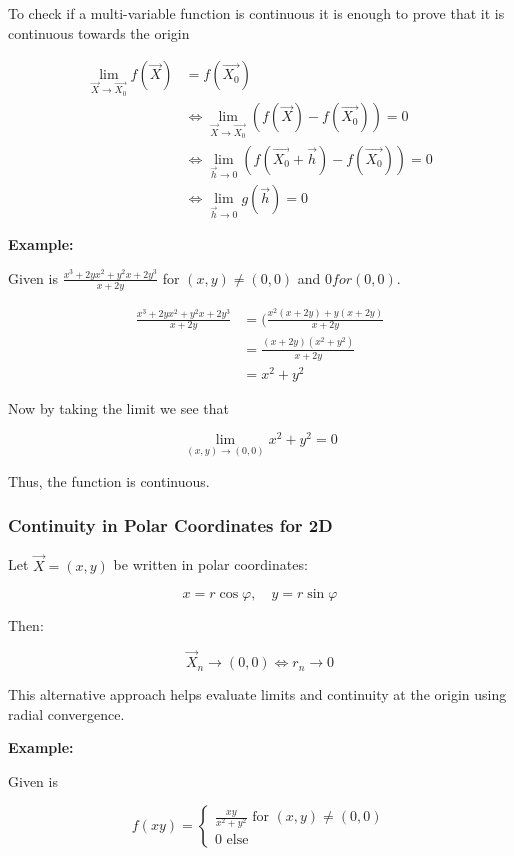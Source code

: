 To check if a multi-variable function is continuous it is enough to prove that it is continuous towards 
the origin

\begin{align*}
    \lim_{\vec{X} \to \vec{X_0}}f(\vec{X}) &= f(\vec{X_0}) \\
    &\iff \lim_{\vec{X} \to \vec{X_0}} \left(f(\vec{X}) - f(\vec{X_0})\right) = 0 \\
    &\iff \lim_{\vec{h} \to 0} \left(f(\vec{X_0} + \vec{h}) - f(\vec{X_0})\right) = 0 \\
    &\iff \lim_{\vec{h} \to 0} g(\vec{h}) = 0
\end{align*}

\textbf{Example:}
\vspace{\baselineskip}

Given is \(\frac{x^3 + 2yx^2 + y^2x + 2y^3}{x + 2y}\) for \((x,y) \ne (0,0)\) and \(0 for (0,0)\).

\begin{align*}
    \frac{x^3 + 2yx^2 + y^2x + 2y^3}{x + 2y} &= (\frac{x^2(x + 2y) + y(x + 2y)}{x + 2y}\\
    &= \frac{(x + 2y)(x^2 + y^2)}{x + 2y}\\
    &= x^2 + y^2
\end{align*}

Now by taking the limit we see that

\[
    \lim_{(x,y) \to (0,0)} x^2 + y^2 = 0
\]

Thus, the function is continuous.


\subsubsection{Continuity in Polar Coordinates for 2D}

Let \( \vec{X} = (x, y) \) be written in polar coordinates:

\[
    x = r \cos \varphi, \quad y = r \sin \varphi
\]

Then:

\[
    \vec{X}_n \to (0, 0) \iff r_n \to 0
\]

This alternative approach helps evaluate limits and continuity at the origin using radial convergence.
\vspace{\baselineskip}

\textbf{Example:}
\vspace{\baselineskip}

Given is 

\[
    f(xy) = 
    \begin{cases}   
    \frac{xy}{x^2 + y^2} \text{ for } (x,y) \ne (0,0) \\ 
    0 \text{ else }
    \end{cases}
\]

